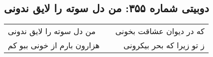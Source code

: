 \begin{center}
\section*{دوبیتی شماره ۳۵۵: من دل سوته را لایق ندونی}
\label{sec:355}
\begin{longtable}{l p{0.5cm} r}
من دل سوته را لایق ندونی
&&
که در دیوان عشاقت بخونی
\\
هزارون بارم از خونی ببو کم
&&
ز تو زیرا که بحر بیکرونی
\\
\end{longtable}
\end{center}
